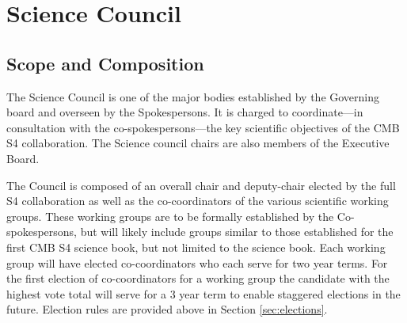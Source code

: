 \documentclass[12pt]{article}
\begin{document}
\section{Science Council}

\subsection{Scope and Composition}
The Science Council is one of the major bodies established by the Governing board and overseen by the Spokespersons. It is charged to coordinate---in consultation with the co-spokespersons---the key scientific objectives of the CMB S4 collaboration. The Science council chairs are also members of the Executive Board. 

The Council is composed of an overall chair and deputy-chair elected by the full S4 collaboration as well as the co-coordinators of the various scientific working groups. These working groups are to be formally established by the Co-spokespersons,
but will likely include groups similar to those established for the first CMB S4 science book, but not limited to the science book. Each working group will have elected co-coordinators who each serve for two year terms. For the first election of co-coordinators for a working group the candidate with the highest vote total will serve for a 3 year term to enable staggered elections in the future. Election rules are provided above in Section \ref{sec:elections}.



\end{document}

